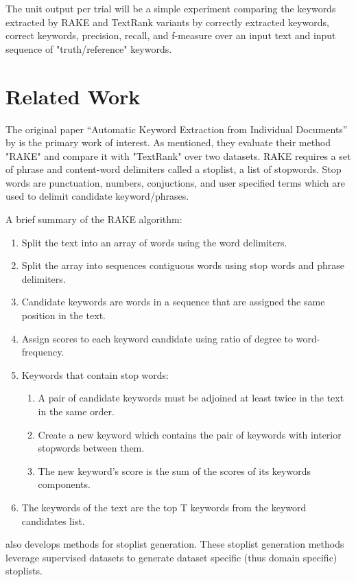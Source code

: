 \documentclass[11pt,a4paper]{article}
\begin{document}
The unit output per trial will be a simple experiment comparing the keywords extracted by RAKE and TextRank variants by correctly extracted keywords, correct keywords, precision, recall, and f-measure over an input text and input sequence of "truth/reference" keywords. 

\section{Related Work}

The original paper “Automatic Keyword Extraction from Individual Documents” by \citet{1} is the primary work of interest. As mentioned, they evaluate their method "RAKE" and compare it with "TextRank" over two datasets. RAKE requires a set of phrase and content-word delimiters called a stoplist, a list of stopwords. Stop words are punctuation, numbers, conjuctions, and user specified terms which are used to delimit candidate keyword/phrases. 

A brief summary of the RAKE algorithm:
\begin{enumerate}
\item Split the text into an array of words using the word delimiters.
\item Split the array into sequences contiguous words using stop words and phrase delimiters.
\item Candidate keywords are words in a sequence that are assigned the same position in the text. 
\item Assign scores to each keyword candidate using ratio of degree to word-frequency. 
\item Keywords that contain stop words:
\begin{enumerate}
\item A pair of candidate keywords must be adjoined at least twice in the text in the same order.
\item Create a new keyword which contains the pair of keywords with interior stopwords between them.
\item The new keyword’s score is the sum of the scores of its keywords components.
\end{enumerate}
\item The keywords of the text are the top T keywords from the keyword candidates list.
\end{enumerate}

\citet{1} also develops methods for stoplist generation. These stoplist generation methods leverage supervised datasets to generate dataset specific (thus domain specific) stoplists. 
\end{document}
